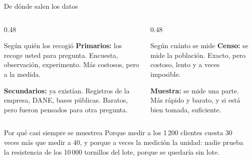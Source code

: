 \documentclass[aspectratio=169,10pt]{beamer}
\begin{document}
\begin{frame}{De dónde salen los datos}
  \scriptsize
  \begin{columns}[T,onlytextwidth]
    \begin{column}{0.48\textwidth}
      \begin{block}{Según quién los recogió}
        \tiny
        \textbf{Primarios:} los recoge usted para  pregunta.
        Encuesta, observación, experimento. Más costosos, pero a la medida.

        \vspace{0.1cm}
        \textbf{Secundarios:} ya existían. Registros de la empresa, DANE,
        bases públicas. Baratos, pero fueron pensados para otra pregunta.
      \end{block}
    \end{column}
    \begin{column}{0.48\textwidth}
      \begin{block}{Según cuánto se mide}
        \tiny
        \textbf{Censo:} se mide  la población. Exacto, pero
        costoso, lento y a veces imposible.

        \vspace{0.1cm}
        \textbf{Muestra:} se mide una parte. Más rápido y barato, y si está
        bien tomada, suficiente.
      \end{block}
    \end{column}
  \end{columns}

  \vspace{0.1cm}
  \begin{alertblock}{Por qué casi siempre se muestrea}
    \scriptsize
    Porque medir a los 1\,200 clientes cuesta 30 veces más que medir a 40, y
    porque a veces la medición  la unidad: nadie prueba la
    resistencia de los 10\,000 tornillos del lote, porque se quedaría sin
    lote.
  \end{alertblock}
\end{frame}
\end{document}
